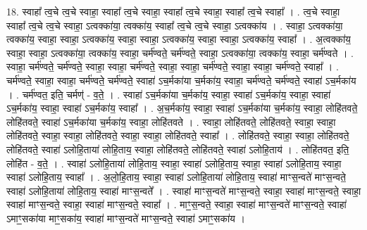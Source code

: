 \documentclass[17pt]{extarticle}
\begin{document}
18. स्वाहा᳚ त्व॒चे त्व॒चे स्वाहा॒ स्वाहा᳚ त्व॒चे स्वाहा॒ स्वाहा᳚ त्व॒चे स्वाहा॒ स्वाहा᳚ त्व॒चे स्वाहा᳚ । . त्व॒चे स्वाहा॒ स्वाहा᳚ त्व॒चे त्व॒चे स्वाहा॒ ऽत्वक्का॑या॒ त्वक्का॑य॒ स्वाहा᳚ त्व॒चे त्व॒चे स्वाहा॒ ऽत्वक्का॑य । . स्वाहा॒ ऽत्वक्का॑या॒ त्वक्का॑य॒ स्वाहा॒ स्वाहा॒ ऽत्वक्का॑य॒ स्वाहा॒ स्वाहा॒ ऽत्वक्का॑य॒ स्वाहा॒ स्वाहा॒ ऽत्वक्का॑य॒ स्वाहा᳚ । . अ॒त्वक्का॑य॒ स्वाहा॒ स्वाहा॒ ऽत्वक्का॑या॒ त्वक्का॑य॒ स्वाहा॒ चर्म॑ण्वते॒ चर्म॑ण्वते॒ स्वाहा॒ ऽत्वक्का॑या॒ त्वक्का॑य॒ स्वाहा॒ चर्म॑ण्वते । . स्वाहा॒ चर्म॑ण्वते॒ चर्म॑ण्वते॒ स्वाहा॒ स्वाहा॒ चर्म॑ण्वते॒ स्वाहा॒ स्वाहा॒ चर्म॑ण्वते॒ स्वाहा॒ स्वाहा॒ चर्म॑ण्वते॒ स्वाहा᳚ । . चर्म॑ण्वते॒ स्वाहा॒ स्वाहा॒ चर्म॑ण्वते॒ चर्म॑ण्वते॒ स्वाहा॑ ऽच॒र्मका॑या च॒र्मका॑य॒ स्वाहा॒ चर्म॑ण्वते॒ चर्म॑ण्वते॒ स्वाहा॑ ऽच॒र्मका॑य । . चर्म॑ण्वत॒ इति॒ चर्मण्॑ - व॒ते॒ । . स्वाहा॑ ऽच॒र्मका॑या च॒र्मका॑य॒ स्वाहा॒ स्वाहा॑ ऽच॒र्मका॑य॒ स्वाहा॒ स्वाहा॑ ऽच॒र्मका॑य॒ स्वाहा॒ स्वाहा॑ ऽच॒र्मका॑य॒ स्वाहा᳚ । . अ॒च॒र्मका॑य॒ स्वाहा॒ स्वाहा॑ ऽच॒र्मका॑या च॒र्मका॑य॒ स्वाहा॒ लोहि॑तवते॒ लोहि॑तवते॒ स्वाहा॑ ऽच॒र्मका॑या च॒र्मका॑य॒ स्वाहा॒ लोहि॑तवते । . स्वाहा॒ लोहि॑तवते॒ लोहि॑तवते॒ स्वाहा॒ स्वाहा॒ लोहि॑तवते॒ स्वाहा॒ स्वाहा॒ लोहि॑तवते॒ स्वाहा॒ स्वाहा॒ लोहि॑तवते॒ स्वाहा᳚ । . लोहि॑तवते॒ स्वाहा॒ स्वाहा॒ लोहि॑तवते॒ लोहि॑तवते॒ स्वाहा॑ ऽलोहि॒ताया॑ लोहि॒ताय॒ स्वाहा॒ लोहि॑तवते॒ लोहि॑तवते॒ स्वाहा॑ ऽलोहि॒ताय॑ । . लोहि॑तवत॒ इति॒ लोहि॑त - व॒ते॒ । . स्वाहा॑ ऽलोहि॒ताया॑ लोहि॒ताय॒ स्वाहा॒ स्वाहा॑ ऽलोहि॒ताय॒ स्वाहा॒ स्वाहा॑ ऽलोहि॒ताय॒ स्वाहा॒ स्वाहा॑ ऽलोहि॒ताय॒ स्वाहा᳚ । . अ॒लो॒हि॒ताय॒ स्वाहा॒ स्वाहा॑ ऽलोहि॒ताया॑ लोहि॒ताय॒ स्वाहा॑ माꣳस॒न्वते॑ माꣳस॒न्वते॒ स्वाहा॑ ऽलोहि॒ताया॑ लोहि॒ताय॒ स्वाहा॑ माꣳस॒न्वते᳚ । . स्वाहा॑ माꣳस॒न्वते॑ माꣳस॒न्वते॒ स्वाहा॒ स्वाहा॑ माꣳस॒न्वते॒ स्वाहा॒ स्वाहा॑ माꣳस॒न्वते॒ स्वाहा॒ स्वाहा॑ माꣳस॒न्वते॒ स्वाहा᳚ । . माꣳ॒॒स॒न्वते॒ स्वाहा॒ स्वाहा॑ माꣳस॒न्वते॑ माꣳस॒न्वते॒ स्वाहा॑ ऽमाꣳ॒॒सका॑या माꣳ॒॒सका॑य॒ स्वाहा॑ माꣳस॒न्वते॑ माꣳस॒न्वते॒ स्वाहा॑ ऽमाꣳ॒॒सका॑य । \newline
\end{document}
